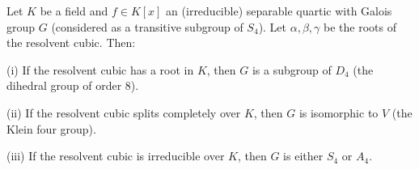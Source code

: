 Let $K$ be a field and $f \in K[x]$ an (irreducible) separable quartic with Galois group $G$ (considered as a transitive subgroup of $S_4$). Let $\alpha, \beta, \gamma$ be the roots of the resolvent cubic. Then:

(i) If the resolvent cubic has a root in $K$, then $G$ is a subgroup of $D_4$ (the dihedral group of order 8).

(ii) If the resolvent cubic splits completely over $K$, then $G$ is isomorphic to $V$ (the Klein four group).

(iii) If the resolvent cubic is irreducible over $K$, then $G$ is either $S_4$ or $A_4$.
